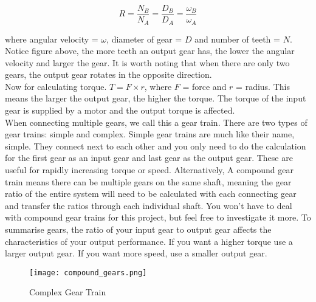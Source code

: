 \documentclass[../TinyBot.tex]{subfiles}
\begin{document}
\[ R = \frac{N_B}{N_A} = \frac{D_B}{D_A} = \frac{\omega_B}{\omega_A} \]

where angular velocity = $\omega$, diameter of gear = $D$ and number of teeth = $N$.
Notice figure above, the more teeth an output gear has, the lower the angular velocity and
larger the gear. It is worth noting that when there are only two gears, the output gear
rotates in the opposite direction. \\

Now for calculating torque. \(T=F \times r\), where $F$ = force and $r$ = radius. This means the larger the output gear, the higher the torque. The torque of the input gear is supplied by a motor and the output torque is affected. \\

When connecting multiple gears, we call this a gear train. There are two types of gear trains:
simple and complex. Simple gear trains are much like their name, simple. They connect next to
each other and you only need to do the calculation for the first gear as an input gear and last
gear as the output gear. These are useful for rapidly increasing torque or speed. Alternatively,
A compound gear train means there can be multiple gears on the same shaft, meaning the gear ratio
of the entire system will need to be calculated with each connecting gear and transfer the ratios
through each individual shaft. You won’t have to deal with compound gear trains for this project,
but feel free to investigate it more. To summarise gears, the ratio of your input gear to output
gear affects the characteristics of your output performance. If you want a higher torque use a
larger output gear. If you want more speed, use a smaller output gear.

\begin{figure}[h]
    \centering
    \texttt{[image: compound\_gears.png]}
    \label{fig:gear-complex}
    \caption{Complex Gear Train}
\end{figure}
\end{document}
